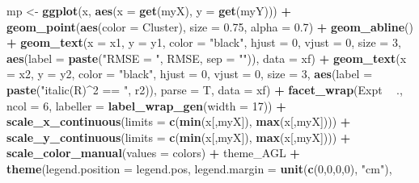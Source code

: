 \documentclass[
]{article}
\newenvironment{Shaded}{\begin{snugshade}}{\end{snugshade}}
\newcommand{\DataTypeTok}[1]{\textcolor[rgb]{0.13,0.29,0.53}{#1}}
\newcommand{\DecValTok}[1]{\textcolor[rgb]{0.00,0.00,0.81}{#1}}
\newcommand{\FloatTok}[1]{\textcolor[rgb]{0.00,0.00,0.81}{#1}}
\newcommand{\KeywordTok}[1]{\textcolor[rgb]{0.13,0.29,0.53}{\textbf{#1}}}
\newcommand{\NormalTok}[1]{#1}
\newcommand{\OperatorTok}[1]{\textcolor[rgb]{0.81,0.36,0.00}{\textbf{#1}}}
\newcommand{\StringTok}[1]{\textcolor[rgb]{0.31,0.60,0.02}{#1}}
\begin{document}
\begin{Shaded}
\begin{Highlighting}[]
{{{{{{{{{{\NormalTok{  mp <-}\StringTok{ }\KeywordTok{ggplot}\NormalTok{(x, }\KeywordTok{aes}\NormalTok{(}\DataTypeTok{x =} \KeywordTok{get}\NormalTok{(myX), }\DataTypeTok{y =} \KeywordTok{get}\NormalTok{(myY))) }\OperatorTok{+}
\StringTok{    }\KeywordTok{geom_point}\NormalTok{(}\KeywordTok{aes}\NormalTok{(}\DataTypeTok{color =}\NormalTok{ Cluster), }\DataTypeTok{size =} \FloatTok{0.75}\NormalTok{, }\DataTypeTok{alpha =} \FloatTok{0.7}\NormalTok{) }\OperatorTok{+}\StringTok{ }\KeywordTok{geom_abline}\NormalTok{() }\OperatorTok{+}
\StringTok{    }\KeywordTok{geom_text}\NormalTok{(}\DataTypeTok{x =}\NormalTok{ x1, }\DataTypeTok{y =}\NormalTok{ y1, }\DataTypeTok{color =} \StringTok{"black"}\NormalTok{, }\DataTypeTok{hjust =} \DecValTok{0}\NormalTok{, }\DataTypeTok{vjust =} \DecValTok{0}\NormalTok{, }\DataTypeTok{size =} \DecValTok{3}\NormalTok{,}
              \KeywordTok{aes}\NormalTok{(}\DataTypeTok{label =} \KeywordTok{paste}\NormalTok{(}\StringTok{"RMSE = "}\NormalTok{, RMSE, }\DataTypeTok{sep =} \StringTok{""}\NormalTok{)), }\DataTypeTok{data =}\NormalTok{ xf) }\OperatorTok{+}
\StringTok{    }\KeywordTok{geom_text}\NormalTok{(}\DataTypeTok{x =}\NormalTok{ x2, }\DataTypeTok{y =}\NormalTok{ y2, }\DataTypeTok{color =} \StringTok{"black"}\NormalTok{, }\DataTypeTok{hjust =} \DecValTok{0}\NormalTok{, }\DataTypeTok{vjust =} \DecValTok{0}\NormalTok{, }\DataTypeTok{size =} \DecValTok{3}\NormalTok{,}
              \KeywordTok{aes}\NormalTok{(}\DataTypeTok{label =} \KeywordTok{paste}\NormalTok{(}\StringTok{"italic(R)^2 == "}\NormalTok{, r2)), }\DataTypeTok{parse =}\NormalTok{ T, }\DataTypeTok{data =}\NormalTok{ xf) }\OperatorTok{+}
\StringTok{    }\KeywordTok{facet_wrap}\NormalTok{(Expt }\OperatorTok{~}\StringTok{ }\NormalTok{., }\DataTypeTok{ncol =} \DecValTok{6}\NormalTok{, }\DataTypeTok{labeller =} \KeywordTok{label_wrap_gen}\NormalTok{(}\DataTypeTok{width =} \DecValTok{17}\NormalTok{)) }\OperatorTok{+}\StringTok{ }
\StringTok{    }\KeywordTok{scale_x_continuous}\NormalTok{(}\DataTypeTok{limits =} \KeywordTok{c}\NormalTok{(}\KeywordTok{min}\NormalTok{(x[,myX]), }\KeywordTok{max}\NormalTok{(x[,myX]))) }\OperatorTok{+}
\StringTok{    }\KeywordTok{scale_y_continuous}\NormalTok{(}\DataTypeTok{limits =} \KeywordTok{c}\NormalTok{(}\KeywordTok{min}\NormalTok{(x[,myX]), }\KeywordTok{max}\NormalTok{(x[,myX]))) }\OperatorTok{+}
\StringTok{    }\KeywordTok{scale_color_manual}\NormalTok{(}\DataTypeTok{values =}\NormalTok{ colors) }\OperatorTok{+}
\StringTok{    }\NormalTok{theme_AGL }\OperatorTok{+}\StringTok{ }
\StringTok{    }\KeywordTok{theme}\NormalTok{(}\DataTypeTok{legend.position =}\NormalTok{ legend.pos, }\DataTypeTok{legend.margin =} \KeywordTok{unit}\NormalTok{(}\KeywordTok{c}\NormalTok{(}\DecValTok{0}\NormalTok{,}\DecValTok{0}\NormalTok{,}\DecValTok{0}\NormalTok{,}\DecValTok{0}\NormalTok{), }\StringTok{"cm"}\NormalTok{),}
}}}}}}}}}}
\end{Highlighting}
\end{Shaded}
\end{document}
